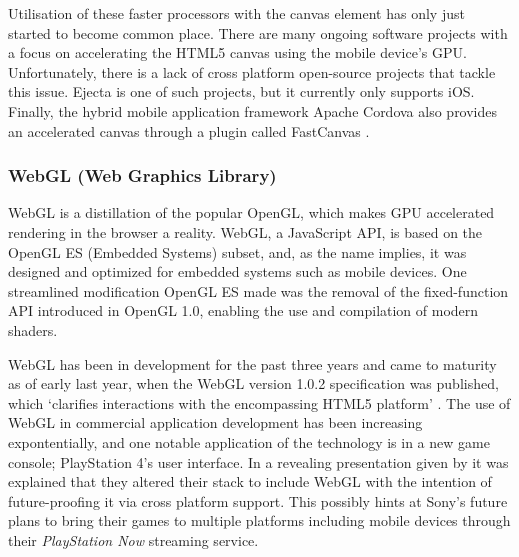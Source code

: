 \documentclass[final]{cmpreport}
\begin{document}
Utilisation of these faster processors with the canvas element has only just started to become common place. There are many ongoing software projects with a focus on accelerating the HTML5 canvas using the mobile device's GPU. Unfortunately, there is a lack of cross platform open-source projects that tackle this issue. Ejecta is one of such projects, but it currently only supports iOS. Finally, the hybrid mobile application framework Apache Cordova \footnotemark also provides an accelerated canvas through a plugin called FastCanvas \footnotemark .


\subsubsection{WebGL (Web Graphics Library)}
WebGL is a distillation of the popular OpenGL, which makes GPU accelerated rendering in the browser a reality. WebGL, a JavaScript API, is based on the OpenGL ES (Embedded Systems) subset, and, as the name implies, it was designed and optimized for embedded systems such as mobile devices. One streamlined modification OpenGL ES made was the removal of the fixed-function API introduced in OpenGL 1.0, enabling the use and compilation of modern shaders.

WebGL has been in development for the past three years and came to maturity as of early last year, when the WebGL version 1.0.2 \footnotemark specification was published, which `clarifies interactions with the encompassing HTML5 platform' \citep{Verry}. The use of WebGL in commercial application development has been increasing expontentially, and one notable application of the technology is in a new game console; PlayStation 4's user interface. In a revealing presentation given by \citet{Olmstead} it was explained that they altered their stack to include WebGL with the intention of future-proofing it via cross platform support. This possibly hints at Sony's future plans to bring their games to multiple platforms including mobile devices through their \textit{PlayStation Now} streaming service. \footnotemark

\end{document}
